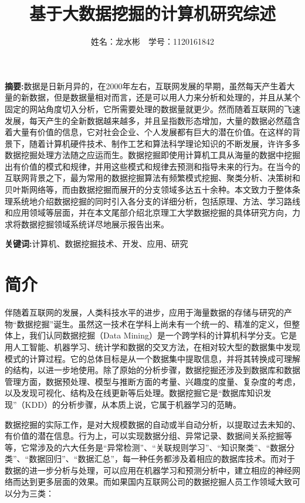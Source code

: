 \documentclass{misc/elegantpaper}
\title{基于大数据挖掘的计算机研究综述}
\author{姓名：龙水彬\ \ 学号：1120161842}
\date{}
\begin{document}
\maketitle

\textbf{摘要:}数据是日新月异的，在2000年左右，互联网发展的早期，虽然每天产生着大量的新数据，但是数据量相对而言，还是可以用人力来分析和处理的，并且从某个固定的网站角度切入分析，它所需要处理的数据量就更少。然而随着互联网的飞速发展，每天产生的全新数据越来越多，并且呈指数形态增加，大量的数据必然蕴含着大量有价值的信息，它对社会企业、个人发展都有巨大的潜在价值。在这样的背景下，随着计算机硬件技术、制作工艺和算法科学理论知识的不断发展，许许多多数据挖掘处理方法随之应运而生。数据挖掘即使用计算机工具从海量的数据中挖掘出有价值的模式和规律，并用这些模式和规律去预测和指导未来的行为。在当今的互联网背景之下，最为常用的数据挖掘算法有频繁模式挖掘、聚类分析、决策树和贝叶斯网络等，而由数据挖掘而展开的分支领域多达五十余种。本文致力于整体条理系统地介绍数据挖掘的同时引入各分支的详细分析，包括原理、方法、学习路线和应用领域等层面，并在本文尾部介绍北京理工大学数据挖掘的具体研究方向，力求将数据挖掘领域系统详尽地展示报告出来。

\textbf{关键词:}计算机、数据挖掘技术、开发、应用、研究

\section{简介}

伴随着互联网的发展，人类科技水平的进步，应用于海量数据的存储与研究的产物“数据挖掘”诞生。虽然这一技术在学科上尚未有一个统一的、精准的定义，但整体上，我们认同数据挖掘（Data Mining）是一个跨学科的计算机科学分支。它是用人工智能、机器学习、统计学和数据的交叉方法，在相对较大型的数据集中发现模式的计算过程。它的总体目标是从一个数据集中提取信息，并将其转换成可理解的结构，以进一步地使用。除了原始的分析步骤，数据挖掘还涉及到数据库和数据管理方面，数据预处理、模型与推断方面的考量、兴趣度的度量、复杂度的考虑，以及发现可视化、结构及在线更新等后处理。数据挖掘它是“数据库知识发现”（KDD）的分析步骤，从本质上说，它属于机器学习的范畴。

数据挖掘的实际工作，是对大规模数据的自动或半自动分析，以提取过去未知的、有价值的潜在信息。行为上，可以实现数据分组、异常记录、数据间关系挖掘等等，它常涉及的六大任务是“异常检测”、“关联规则学习”、“知识聚类”、“数据分类”、“数据回归”、“数据汇总”，每一种任务都涉及着相应的数据库技术。而对于数据的进一步分析与处理，可以应用在机器学习和预测分析中，建立相应的神经网络而达到更多层面的效果。而如果国内互联网公司的数据挖掘人员工作领域大致可以分为三类：
\end{document}
